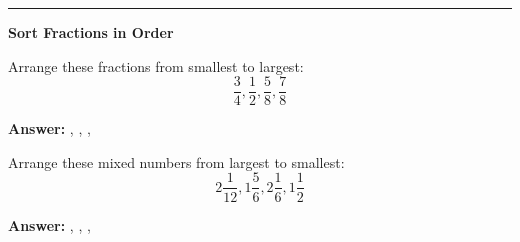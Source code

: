 \documentclass[11pt]{article}
\begin{document}
{\begin{itemize}
\end{itemize}

\vspace{0.3cm}
\hrule
\vspace{0.3cm}

\textbf{Sort Fractions in Order}

Arrange these fractions from smallest to largest:
$$\frac{3}{4}, \frac{1}{2}, \frac{5}{8}, \frac{7}{8}$$

\textbf{Answer:} \underline{\hspace{1cm}}, \underline{\hspace{1cm}}, \underline{\hspace{1cm}}, \underline{\hspace{1cm}}

\vspace{0.2cm}


Arrange these mixed numbers from largest to smallest:
$$2\frac{1}{12}, 1\frac{5}{6}, 2\frac{1}{6}, 1\frac{1}{2}$$

\textbf{Answer:} \underline{\hspace{1.2cm}}, \underline{\hspace{1.2cm}}, \underline{\hspace{1.2cm}}, \underline{\hspace{1.2cm}}

}
\end{document}
